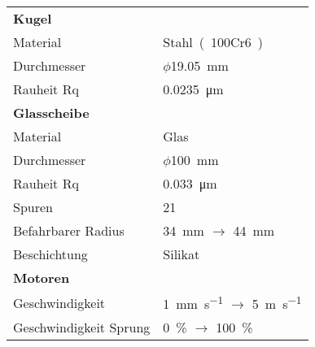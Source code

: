 \begin{table}[htb]
    \centering
    \begin{tabular}{m{5cm}l}
        \textbf{Kugel}          &                                                                                                           \\
        Material                & \si{Stahl~(100Cr6)}                                                                                       \\
        Durchmesser             & $\phi$\SI{19.05}{\milli\meter}                                                                            \\
        Rauheit Rq              & \SI{0.0235}{\micro\meter}                                                                                 \\
        \hline
        \textbf{Glasscheibe}    &                                                                                                           \\
        Material                & \si{Glas}                                                                                                 \\
        Durchmesser             & $\phi$\SI{100}{\milli\meter}                                                                              \\
        Rauheit Rq              & \SI{0.033}{\micro\meter}                                                                                  \\
        Spuren                  & \num{21}                                                                                                  \\
        Befahrbarer Radius      & \SI{34}{\milli\meter} $\rightarrow$ \SI{44}{\milli\meter}                                                 \\
        Beschichtung            & \si{Silikat}                                                                                              \\
        \hline
        \textbf{Motoren}        &                                                                                                           \\
        Geschwindigkeit         & \SI[per-mode=symbol]{1}{\milli\meter\per\second} $\rightarrow$ \SI[per-mode=symbol]{5}{\meter\per\second} \\
        Geschwindigkeit Sprung  & \SI{0}{\percent} $\rightarrow$ \SI{100}{\percent}                                                         \\

\end{tabular}
\end{table}
